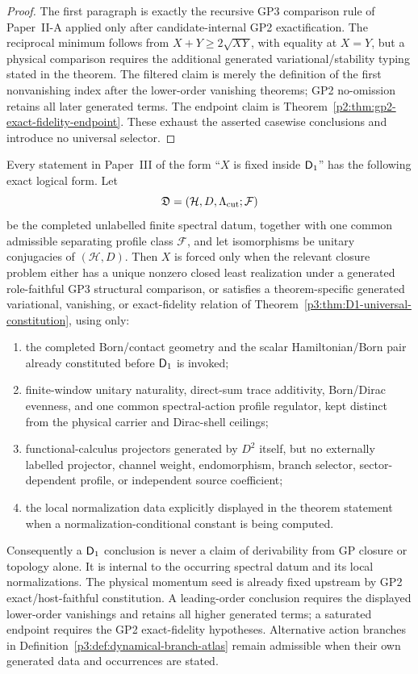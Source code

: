 \documentclass[12pt,a4paper]{article}
\begin{document}
\begin{proof}
The first paragraph is exactly the recursive GP3 comparison rule of
Paper~II-A applied only after candidate-internal GP2 exactification.  The
reciprocal minimum follows from
\(X+Y\ge2\sqrt{XY}\), with equality at \(X=Y\), but a physical comparison
requires the additional generated variational/stability typing stated in the
theorem.  The filtered claim is merely the definition of the first
nonvanishing index after the lower-order vanishing theorems; GP2 no-omission
retains all later generated terms.  The endpoint claim is
Theorem~\ref{p2:thm:gp2-exact-fidelity-endpoint}.  These exhaust the asserted
casewise conclusions and introduce no universal selector.
\end{proof}

\begin{theorem}
\label{p3:thm:D1-hypothesis-boundary}
Every statement in Paper~III of the form ``\(X\) is fixed inside
\(\mathsf{D}_1\)'' has the following exact logical form.  Let
\[
        \mathfrak D=(\mathcal H,D,\Lambda_{\mathrm{cut}};\mathcal F)
\]
be the completed unlabelled finite spectral datum, together with one common
admissible separating profile class \(\mathcal F\), and let isomorphisms be
unitary conjugacies of \((\mathcal H,D)\).  Then \(X\) is forced only when the
relevant closure problem either has a unique nonzero closed least realization
under a generated role-faithful GP3 structural comparison, or satisfies a
theorem-specific generated variational, vanishing, or exact-fidelity relation
of Theorem~\ref{p3:thm:D1-universal-constitution}, using only:
\begin{enumerate}[label=(\roman*),leftmargin=2.1em]
\item the completed Born/contact geometry and the scalar Hamiltonian/Born pair already constituted before \(\mathsf{D}_1\) is invoked;
\item finite-window unitary naturality, direct-sum trace additivity,
Born/Dirac evenness, and one common spectral-action profile regulator, kept
distinct from the physical carrier and Dirac-shell ceilings;
\item functional-calculus projectors generated by \(D^2\) itself, but no externally labelled projector, channel weight, endomorphism, branch selector, sector-dependent profile, or independent source coefficient;
\item the local normalization data explicitly displayed in the theorem statement when a normalization-conditional constant is being computed.
\end{enumerate}
Consequently a \(\mathsf{D}_1\) conclusion is never a claim of derivability from GP
closure or topology alone.  It is internal to the occurring spectral datum and
its local normalizations.  The physical momentum seed is already fixed
upstream by GP2 exact/host-faithful constitution.  A leading-order conclusion
requires the displayed lower-order vanishings and retains all higher generated
terms; a saturated endpoint requires the GP2 exact-fidelity hypotheses.
Alternative action branches in
Definition~\ref{p3:def:dynamical-branch-atlas} remain admissible when their
own generated data and occurrences are stated.
\end{theorem}
\end{document}
